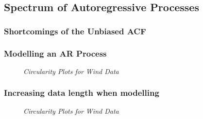 \documentclass[./main.tex]{subfiles}
\begin{document}
\subsection{Spectrum of Autoregressive Processes}

\subsubsection{Shortcomings of the Unbiased ACF}

\subsubsection{Modelling an AR Process}

\begin{figure}[h]
	\centering 
	\resizebox{\textwidth}{!}{}
	\caption{\textit{Circularity Plots for Wind Data}}
	\label{fig:2_2_b}
\end{figure}


\subsubsection{Increasing data length when modelling}


\begin{figure}[h]
	\centering 
	\resizebox{\textwidth}{!}{}
	\caption{\textit{Circularity Plots for Wind Data}}
	\label{fig:2_2_c}
\end{figure}



 		
         
 		
\end{document}
